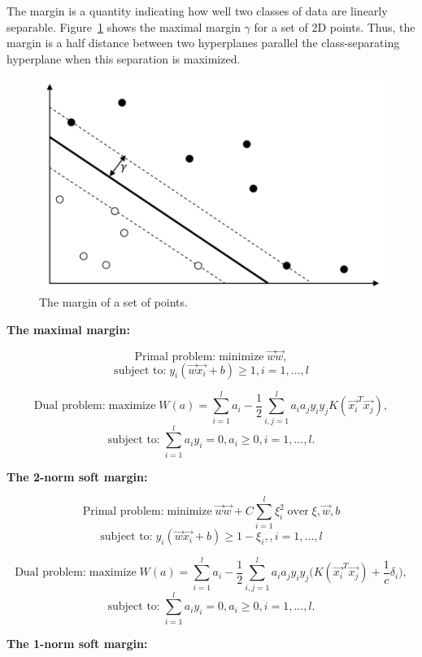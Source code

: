 The margin is a quantity indicating how well two classes of data are linearly separable. Figure~\ref{fig:hyperplane3} shows the maximal margin $\gamma$ for a set of 2D points. Thus, the margin is a half distance between two hyperplanes parallel the class-separating hyperplane when this separation is maximized.
\begin{figure}[h!]
    \centering
    \includegraphics[scale=0.6]{Graphics/svm-margins.png}
    \caption{The margin of a set of points.}
    \label{fig:hyperplane3}
\end{figure}

\textbf{The maximal margin:}

\[\textrm{Primal problem:}\; \textrm{minimize}\; \vec{w} \vec{w},\] \[\textrm{subject to:}\; y_i(\vec{w}\vec{x_i} + b) \geq 1, i = 1, ...,l \] 

\[\textrm{Dual problem:}\; \textrm{maximize}\; W(a) =  \sum_{i=1}^{l} a_i - \frac{1}{2}\sum_{i,j = 1}^{l}a_i a_j y_i y_j K(\vec{x_i}^T \vec{x_j}), \] 
\[\textrm{subject to:}\; \sum_{i=1}^{l}a_i y_i = 0, a_i \geq 0, i = 1,...,l.\] 

\textbf{The 2-norm soft margin:}

\[\textrm{Primal problem:}\; \textrm{minimize}\; \vec{w} \vec{w} + C \sum_{i=1}^{l} \xi^2_i\; \textrm{over}\; \xi,\vec{w},b\] 
\[\textrm{subject to:}\; y_i(\vec{w}\vec{x_i} + b) \geq 1 - \xi_i,, i = 1, ...,l \] 

\[\textrm{Dual problem:}\; \textrm{maximize}\; W(a) =  \sum_{i=1}^{l} a_i - \frac{1}{2}\sum_{i,j = 1}^{l}a_i a_j y_i y_j \Big( K(\vec{x_i}^T \vec{x_j}) + \frac{1}{c}\delta_i \Big), \] 
\[\textrm{subject to:}\; \sum_{i=1}^{l}a_i y_i = 0, a_i \geq 0, i = 1,...,l.\] 

\textbf{The 1-norm soft margin:}

